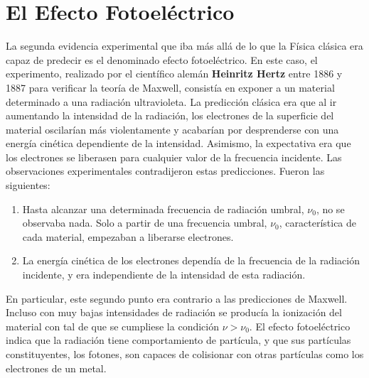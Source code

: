 \section{El Efecto Fotoeléctrico}
La segunda evidencia experimental que iba más allá de lo que la 
Física clásica era capaz de predecir es el denominado efecto
fotoeléctrico. 
En este caso, el experimento, realizado por el científico
alemán \textbf{Heinritz Hertz} entre 1886 y 1887 para
verificar la teoría de Maxwell, consistía en 
exponer a un material determinado a una radiación ultravioleta.
La predicción clásica era que al ir aumentando la intensidad
de la radiación, los electrones de la superficie del material
oscilarían más violentamente y acabarían por desprenderse
con una energía cinética dependiente de la intensidad.
Asimismo, la expectativa era que los electrones se liberasen
para cualquier valor de la frecuencia incidente.
Las observaciones experimentales contradijeron estas predicciones.
Fueron las siguientes:
\begin{enumerate}
    \item Hasta alcanzar una determinada frecuencia de radiación
    umbral, $\nu_0$, no se observaba nada. Solo a
    partir de una frecuencia umbral, $\nu_0$, característica
    de cada material, empezaban a liberarse electrones.
    \item La energía cinética de los electrones dependía de la frecuencia de la radiación incidente, y era independiente de
    la intensidad de esta radiación.
\end{enumerate}
En particular, este segundo punto era contrario a las predicciones de
Maxwell. Incluso con muy bajas intensidades de radiación
se producía la ionización del material con tal de que se cumpliese
la condici\'on $\nu>\nu_0$.
El efecto fotoeléctrico indica que la radiación
tiene comportamiento de partícula, y que sus partículas 
constituyentes, los fotones, son capaces de colisionar
con otras partículas como los electrones de un metal. 

